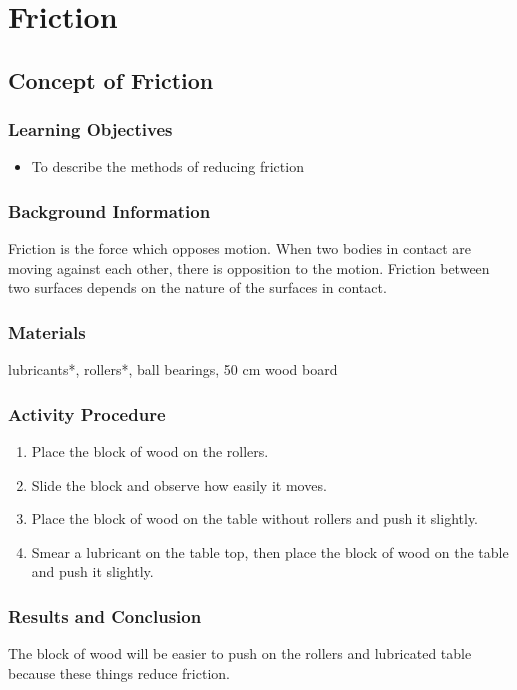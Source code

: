 \section{Friction}

\subsection{Concept of Friction}

\subsubsection*{Learning Objectives}
\begin{itemize}
\item{To describe the methods of reducing friction} 
\end{itemize}

\subsubsection*{Background Information}
Friction is the force which opposes motion.  When two bodies in contact are moving against each other, there is opposition to the motion.  Friction between two surfaces depends on the nature of the surfaces in contact.

\subsubsection*{Materials}
lubricants*, rollers*, ball bearings, 50 cm wood board

\subsubsection*{Activity Procedure}
\begin{enumerate}
\item{Place the block of wood on the rollers.} 
\item{Slide the block and observe how easily it moves.} 
\item{Place the block of wood on the table without rollers and push it slightly.} 
\item{Smear a lubricant on the table top, then place the block of wood on the table and push it slightly.} 
\end{enumerate}

\subsubsection*{Results and Conclusion}
The block of wood will be easier to push on the rollers and lubricated table because these things reduce friction.  

